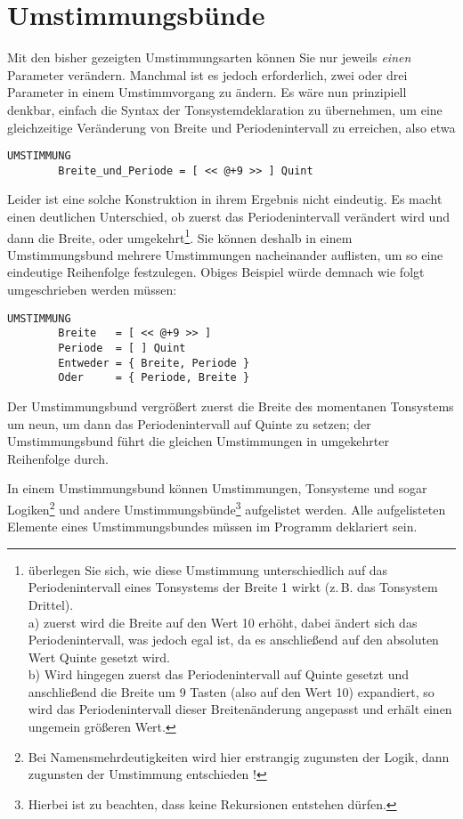 \section{Umstimmungsbünde}\label{sec:umstimmungsbunde}
Mit den bisher gezeigten Umstimmungsarten können Sie nur jeweils {\em
  einen} Parameter verändern. Manchmal ist es jedoch erforderlich,
zwei oder drei Parameter in einem Umstimmvorgang zu ändern. Es wäre
nun prinzipiell denkbar, einfach die Syntax der Tonsystemdeklaration
zu übernehmen, um eine gleichzeitige Veränderung von Breite und
Periodenintervall zu erreichen, also etwa
\begin{verbatim}
UMSTIMMUNG
	    Breite_und_Periode = [ << @+9 >> ] Quint
\end{verbatim}
Leider ist eine solche Konstruktion in ihrem Ergebnis nicht eindeutig.
Es macht einen deutlichen Unterschied, ob zuerst das Periodenintervall
verändert wird und dann die Breite, oder umgekehrt\footnote{überlegen
Sie sich, wie diese Umstimmung unterschiedlich auf das Periodenintervall
eines Tonsystems der Breite 1 wirkt (z.\,B. das Tonsystem Drittel). \\
a) zuerst wird die Breite auf den Wert 10 erhöht, dabei ändert sich das
Periodenintervall, was jedoch egal ist, da es anschließend auf den
absoluten Wert Quinte gesetzt wird. \\ b) Wird hingegen zuerst das
Periodenintervall auf Quinte gesetzt und anschließend die Breite um 9 Tasten (also auf den Wert 10)
expandiert, so wird das Periodenintervall dieser Breitenänderung
angepasst und erhält einen ungemein größeren Wert.}. Sie können deshalb
in einem Umstimmungsbund mehrere Umstimmungen nacheinander auflisten,
um so eine eindeutige Reihenfolge festzulegen. Obiges Beispiel würde
demnach wie folgt umgeschrieben werden müssen:
\begin{verbatim}
UMSTIMMUNG
	    Breite   = [ << @+9 >> ]
	    Periode  = [ ] Quint
	    Entweder = { Breite, Periode }
	    Oder     = { Periode, Breite }
\end{verbatim}
Der Umstimmungsbund  vergrößert zuerst die Breite des
momentanen Tonsystems um neun, um dann das Periodenintervall auf Quinte
zu setzen; der Umstimmungsbund  führt die gleichen
Umstimmungen in umgekehrter Reihenfolge durch.

In einem Umstimmungsbund können Umstimmungen, Tonsysteme und sogar Logiken\footnote{Bei
Namensmehrdeutigkeiten wird hier erstrangig zugunsten der Logik,
dann zugunsten der Umstimmung entschieden
!} und andere Um\-stim\-mungs\-bün\-de\footnote{Hierbei ist zu beachten, dass
keine Rekursionen entstehen dürfen.} aufgelistet werden. 
Alle aufgelisteten Elemente eines Umstimmungsbundes müssen
im Programm deklariert sein.


